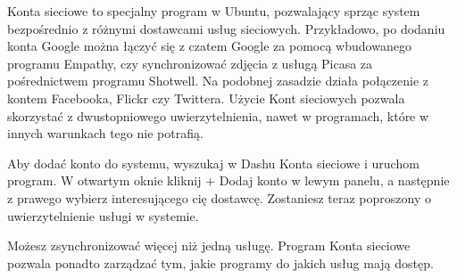 \textcolor{ubuntu_orange}{Konta sieciowe} to specjalny program w Ubuntu, pozwalający sprząc system bezpośrednio z różnymi dostawcami usług sieciowych. Przykładowo, po dodaniu konta Google można łączyć się z czatem Google za pomocą wbudowanego programu Empathy, czy synchronizować zdjęcia z usługą Picasa za pośrednictwem programu Shotwell. Na podobnej zasadzie działa połączenie z kontem Facebooka, Flickr czy Twittera. Użycie \textcolor{ubuntu_orange}{Kont sieciowych} pozwala skorzystać z dwustopniowego uwierzytelnienia, nawet w programach, które w innych warunkach tego nie potrafią.

\begin{center}
\end{center}

Aby dodać konto do systemu, wyszukaj w Dashu \textcolor{ubuntu_orange}{Konta sieciowe} i uruchom program. W otwartym oknie kliknij \textcolor{ubuntu_orange}{+ Dodaj konto}  w lewym panelu, a następnie z prawego wybierz interesującego cię dostawcę. Zostaniesz teraz poproszony o uwierzytelnienie usługi w systemie.

Możesz zsynchronizować więcej niż jedną usługę. Program \textcolor{ubuntu_orange}{Konta sieciowe} pozwala ponadto zarządzać tym, jakie programy do jakich usług mają dostęp. 
